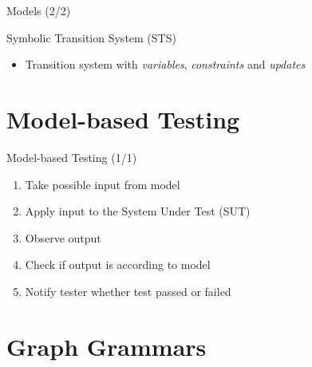 \documentclass{FMTslides}
\begin{document}
\begin{frame}{Models (2/2)}
\begin{block}{Symbolic Transition System (STS)}
\begin{itemize}
  \item Transition system with \textit{variables}, \textit{constraints} and \textit{updates}
\end{itemize}
\end{block}
\begin{figure}

\end{figure}
\end{frame}

\section{Model-based Testing}

\begin{frame}{Model-based Testing (1/1)}
\begin{figure}

\end{figure}
\begin{enumerate}[<+->]
\item Take possible input from model
\item Apply input to the System Under Test (SUT)
\item Observe output
\item Check if output is according to model
\item Notify tester whether test passed or failed
\end{enumerate}
\end{frame}

\section{Graph Grammars}
\end{document}
